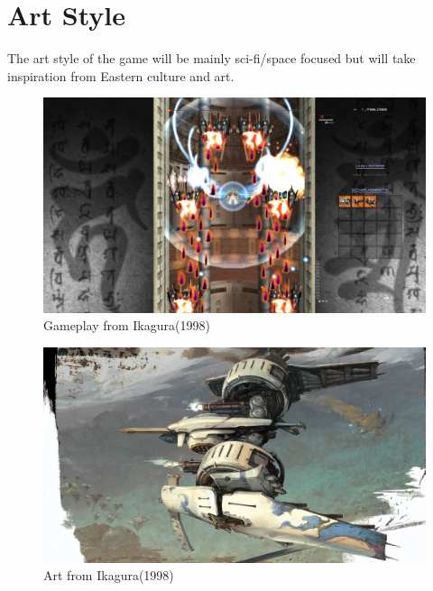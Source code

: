 \documentclass[a4paper]{scrreprt}
\begin{document}
\section{Art Style}
The art style of the game will be mainly sci-fi/space focused but will take inspiration from Eastern culture and art. 
\begin{figure}[h!]
\centering
\includegraphics[width=1\textwidth]{IkaguraGameplay}
\caption{\label{fig:art}Gameplay from Ikagura(1998)}
\end{figure}
  

\begin{figure}[h!]
\centering
\includegraphics[width=1\textwidth]{Ikagura}
\caption{\label{fig:art}Art from Ikagura(1998)}
\end{figure}
\end{document}

